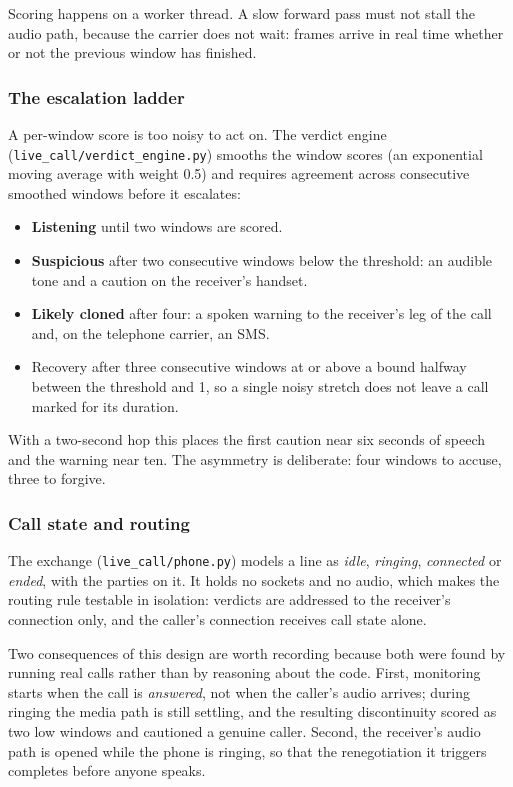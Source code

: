 Scoring happens on a worker thread. A slow forward pass must not stall the audio
path, because the carrier does not wait: frames arrive in real time whether or not
the previous window has finished.

\subsubsection{The escalation ladder}

A per-window score is too noisy to act on. The verdict engine
(\texttt{live\_call/verdict\_engine.py}) smooths the window scores (an exponential
moving average with weight 0.5) and requires agreement across consecutive smoothed
windows before it escalates:

\begin{itemize}
  \item \textbf{Listening} until two windows are scored.
  \item \textbf{Suspicious} after two consecutive windows below the threshold: an
    audible tone and a caution on the receiver's handset.
  \item \textbf{Likely cloned} after four: a spoken warning to the receiver's leg of
    the call and, on the telephone carrier, an SMS.
  \item Recovery after three consecutive windows at or above a bound halfway between
    the threshold and 1, so a single noisy stretch does not leave a call marked for its
    duration.
\end{itemize}

With a two-second hop this places the first caution near six seconds of speech and
the warning near ten. The asymmetry is deliberate: four windows to accuse, three to
forgive.

\subsubsection{Call state and routing}

The exchange (\texttt{live\_call/phone.py}) models a line as
\emph{idle}, \emph{ringing}, \emph{connected} or \emph{ended}, with the parties on
it. It holds no sockets and no audio, which makes the routing rule testable in
isolation: verdicts are addressed to the receiver's connection only, and the
caller's connection receives call state alone.

Two consequences of this design are worth recording because both were found by
running real calls rather than by reasoning about the code. First, monitoring starts
when the call is \emph{answered}, not when the caller's audio arrives; during
ringing the media path is still settling, and the resulting discontinuity scored as
two low windows and cautioned a genuine caller. Second, the receiver's audio path is
opened while the phone is ringing, so that the renegotiation it triggers completes
before anyone speaks.

